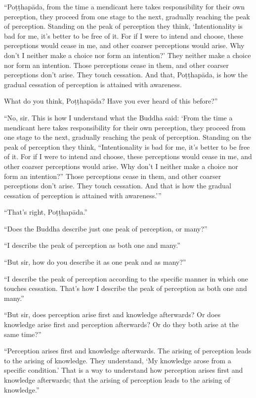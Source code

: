 \documentclass[12pt,openany]{book}%
\begin{document}
“\textsanskrit{Poṭṭhapāda}, from the time a mendicant here takes responsibility for their own perception, they proceed from one stage to the next, gradually reaching the peak of perception. Standing on the peak of perception they think, ‘Intentionality is bad for me, it’s better to be free of it. For if I were to intend and choose, these perceptions would cease in me, and other coarser perceptions would arise. Why don’t I neither make a choice nor form an intention?’ They neither make a choice nor form an intention. Those perceptions cease in them, and other coarser perceptions don’t arise. They touch cessation. And that, \textsanskrit{Poṭṭhapāda}, is how the gradual cessation of perception is attained with awareness. 

What do you think, \textsanskrit{Poṭṭhapāda}? Have you ever heard of this before?” 

“No, sir. This is how I understand what the Buddha said: ‘From the time a mendicant here takes responsibility for their own perception, they proceed from one stage to the next, gradually reaching the peak of perception. Standing on the peak of perception they think, “Intentionality is bad for me, it’s better to be free of it. For if I were to intend and choose, these perceptions would cease in me, and other coarser perceptions would arise. Why don’t I neither make a choice nor form an intention?” Those perceptions cease in them, and other coarser perceptions don’t arise. They touch cessation. And that is how the gradual cessation of perception is attained with awareness.’” 

“That’s right, \textsanskrit{Poṭṭhapāda}.” 

“Does the Buddha describe just one peak of perception, or many?” 

“I describe the peak of perception as both one and many.” 

“But sir, how do you describe it as one peak and as many?” 

“I describe the peak of perception according to the specific manner in which one touches cessation. That’s how I describe the peak of perception as both one and many.” 

“But sir, does perception arise first and knowledge afterwards? Or does knowledge arise first and perception afterwards? Or do they both arise at the same time?” 

“Perception arises first and knowledge afterwards. The arising of perception leads to the arising of knowledge. They understand, ‘My knowledge arose from a specific condition.’ That is a way to understand how perception arises first and knowledge afterwards; that the arising of perception leads to the arising of knowledge.” 
\end{document}
